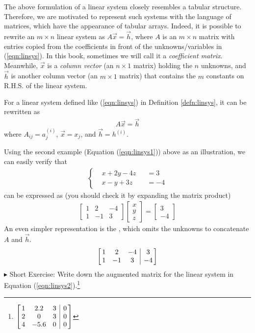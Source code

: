 The above formulation of a linear system closely resembles a tabular structure. Therefore, we are motivated to represent such systems with the language of matrices, which have the appearance of tabular arrays. Indeed, it is possible to rewrite an $m \times n$ linear system as $A\vec{x} = \vec{h}$, where $A$ is an $m \times n$ matrix with entries copied from the coefficients in front of the unknowns/variables in (\ref{eqn:linsys}). In this book, sometimes we will call it a \textit{coefficient matrix}. Meanwhile, $\vec{x}$ is a \textit{column vector} (an $n \times 1$ matrix) holding the $n$ unknowns, and $\vec{h}$ is another column vector (an $m \times 1$ matrix) that contains the $m$ constants on R.H.S. of the linear system.
\begin{proper}
\label{proper:linsysmat}
For a linear system defined like (\ref{eqn:linsys}) in Definition \ref{defn:linsys}, it can be rewritten as 
\begin{align}
A\vec{x} = \vec{h}    
\end{align}
where $A_{ij} = a_{j}^{(i)}$, $\vec{x} = x_j$, and $\vec{h} = h^{(i)}$.
\end{proper}
Using the second example (Equation (\ref{eqn:linsys1})) above as an illustration, we can easily verify that
\begin{align*}
\left\{\begin{alignedat}{2}
&x + 2y - 4z& &= 3 \\
&x - y + 3z& &= -4
\end{alignedat}\right.
\end{align*}
can be expressed as (you should check it by expanding the matrix product)
\begin{align*}
\begin{bmatrix}
1 & 2 & -4 \\
1 & -1 & 3 
\end{bmatrix}
\begin{bmatrix}
x \\
y \\
z
\end{bmatrix}
=
\begin{bmatrix}
3 \\
-4
\end{bmatrix}
\end{align*}
An even simpler representation is the , which omits the unknowns to concatenate $A$ and $\vec{h}$.
\begin{equation*}
\left[\begin{array}{@{\,}ccc|c@{\,}}
1 & 2 & -4 & 3\\
1 & -1 & 3 & -4
\end{array}\right]
\end{equation*}
$\blacktriangleright$ Short Exercise: Write down the augmented matrix for the linear system in Equation (\ref{eqn:linsys2}).\footnote{$
\left[\begin{array}{@{\,}ccc|c@{\,}}
1 & 2.2 & 3 & 0 \\
2 & 0 & 3 & 0 \\
4 & -5.6 & 0 & 0 \\
\end{array}\right]$}

